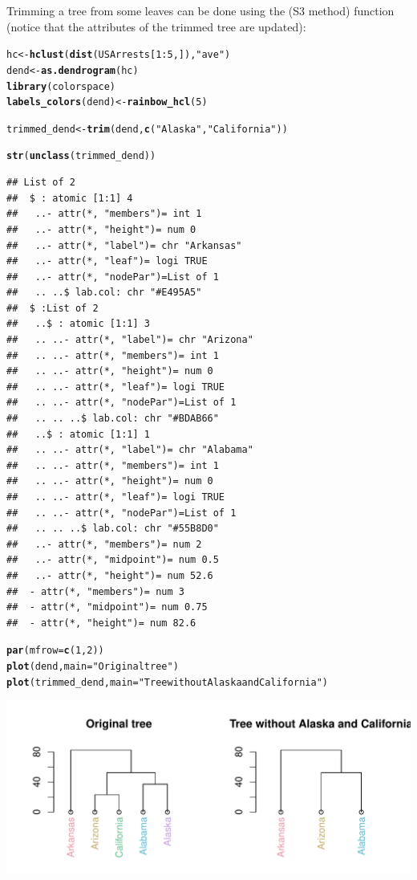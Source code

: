 \documentclass[shortnames,nojss,article]{jss}\usepackage{graphicx, color}
\makeatletter
\def\maxwidth{ %
  \ifdim\Gin@nat@width>\linewidth
    \linewidth
  \else
    \Gin@nat@width
  \fi
}
\newcommand{\hlfunctioncall}[1]{\textcolor[rgb]{0.501960784313725,0,0.329411764705882}{\textbf{#1}}}%
\newcommand{\hlstring}[1]{\textcolor[rgb]{0.6,0.6,1}{#1}}%
\newenvironment{kframe}{%
 \def\at@end@of@kframe{}%
 \ifinner\ifhmode%
  \def\at@end@of@kframe{\end{minipage}}%
  \begin{minipage}{\columnwidth}%
 \fi\fi%
 \def\FrameCommand##1{\hskip\@totalleftmargin \hskip-\fboxsep
 \colorbox{shadecolor}{##1}\hskip-\fboxsep
     \hskip-\linewidth \hskip-\@totalleftmargin \hskip\columnwidth}%
 \MakeFramed {\advance\hsize-\width
   \@totalleftmargin\z@ \linewidth\hsize
   \@setminipage}}%
 {\par\unskip\endMakeFramed%
 \at@end@of@kframe}
\newenvironment{knitrout}{}{} %
\makeatother
\begin{document}
Trimming a tree from some leaves can be done using the  (S3 method) function (notice that the attributes of the trimmed tree are updated):

\begin{knitrout}
\color{fgcolor}\begin{kframe}
\begin{alltt}

hc <- \hlfunctioncall{hclust}(\hlfunctioncall{dist}(USArrests[1:5, ]), \hlstring{"ave"})
dend <- \hlfunctioncall{as.dendrogram}(hc)
\hlfunctioncall{library}(colorspace)
\hlfunctioncall{labels_colors}(dend) <- \hlfunctioncall{rainbow_hcl}(5)

trimmed_dend <- \hlfunctioncall{trim}(dend, \hlfunctioncall{c}(\hlstring{"Alaska"}, \hlstring{"California"}))

\hlfunctioncall{str}(\hlfunctioncall{unclass}(trimmed_dend))
\end{alltt}
\begin{verbatim}
## List of 2
##  $ : atomic [1:1] 4
##   ..- attr(*, "members")= int 1
##   ..- attr(*, "height")= num 0
##   ..- attr(*, "label")= chr "Arkansas"
##   ..- attr(*, "leaf")= logi TRUE
##   ..- attr(*, "nodePar")=List of 1
##   .. ..$ lab.col: chr "#E495A5"
##  $ :List of 2
##   ..$ : atomic [1:1] 3
##   .. ..- attr(*, "label")= chr "Arizona"
##   .. ..- attr(*, "members")= int 1
##   .. ..- attr(*, "height")= num 0
##   .. ..- attr(*, "leaf")= logi TRUE
##   .. ..- attr(*, "nodePar")=List of 1
##   .. .. ..$ lab.col: chr "#BDAB66"
##   ..$ : atomic [1:1] 1
##   .. ..- attr(*, "label")= chr "Alabama"
##   .. ..- attr(*, "members")= int 1
##   .. ..- attr(*, "height")= num 0
##   .. ..- attr(*, "leaf")= logi TRUE
##   .. ..- attr(*, "nodePar")=List of 1
##   .. .. ..$ lab.col: chr "#55B8D0"
##   ..- attr(*, "members")= num 2
##   ..- attr(*, "midpoint")= num 0.5
##   ..- attr(*, "height")= num 52.6
##  - attr(*, "members")= num 3
##  - attr(*, "midpoint")= num 0.75
##  - attr(*, "height")= num 82.6
\end{verbatim}
\begin{alltt}

\hlfunctioncall{par}(mfrow = \hlfunctioncall{c}(1, 2))
\hlfunctioncall{plot}(dend, main = \hlstring{"Original tree"})
\hlfunctioncall{plot}(trimmed_dend, main = \hlstring{"Tree without Alaska and California"})
\end{alltt}
\end{kframe}

{\centering \includegraphics[width=\maxwidth]{figure/unnamed-chunk-28} 

}
\end{knitrout}
\end{document}
